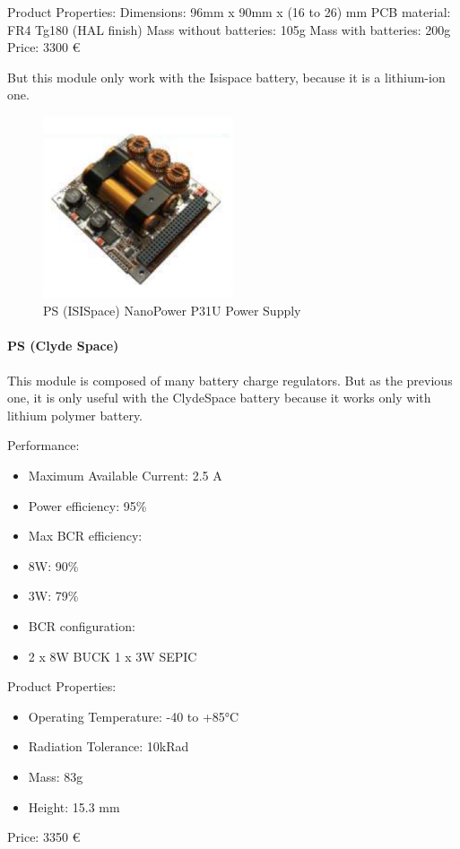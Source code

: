 Product Properties:
Dimensions: 96mm x 90mm x (16 to 26) mm
PCB material: FR4 Tg180 (HAL finish)
Mass without batteries: 105g
Mass with batteries: 200g
Price: 3300 \euro

But this module only work with the Isispace battery, because it is a lithium-ion one.

\begin{figure}[h]
	\centering
	\includegraphics[width=0.5\textwidth]{img/PS_isispace.png}
	\caption{PS (ISISpace) NanoPower P31U Power Supply}
	\label{fig:PS_isispace}
\end{figure}


\paragraph{PS (Clyde Space)}

This module is composed of many battery charge regulators. But as the previous one,
it is only useful with the ClydeSpace battery because it works only with lithium polymer battery.

Performance:

\begin{itemize}
	\item Maximum Available Current: 2.5 A
	\item Power efficiency: 95\%
	\item Max BCR efficiency:
	\item 8W: 90\%
	\item 3W: 79\%
	\item BCR configuration:
	\item 2 x 8W BUCK 1 x 3W SEPIC
\end{itemize}

Product Properties:

\begin{itemize}
	\item Operating Temperature: -40 to +85°C
	\item Radiation Tolerance: 10kRad
	\item Mass: 83g
	\item Height: 15.3 mm
\end{itemize}
Price: 3350 \euro
